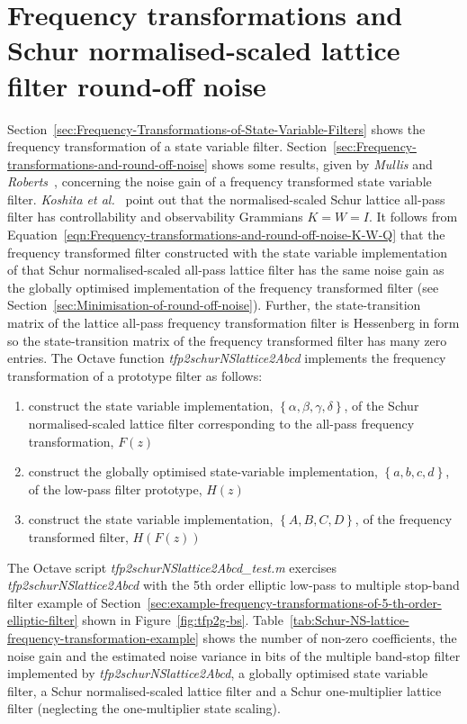 \documentclass[a4paper,twoside,10pt,english]{report}
\begin{document}
\section{\label{sec:Frequency-transformations-and-normalised-scaled-lattice-filter-round-off-noise}Frequency transformations and Schur normalised-scaled lattice filter round-off noise}
Section~\ref{sec:Frequency-Transformations-of-State-Variable-Filters} shows
the frequency transformation of a state variable filter. 
Section~\ref{sec:Frequency-transformations-and-round-off-noise} shows some
results, given by \emph{Mullis} and \emph{Roberts}~\cite[Section III]
{MullisRoberts_RoundoffNoiseInDigitalFiltersFrequencyTransformations},
concerning the noise gain of a frequency transformed state variable filter. 
\emph{Koshita et al.}~\cite{Koshita_et_al_GramianPreservingFrequencyTransformationNormalisedLattice} 
point out that the normalised-scaled Schur lattice all-pass filter has 
controllability and observability Grammians $K=W=I$. It follows from 
Equation~\ref{eqn:Frequency-transformations-and-round-off-noise-K-W-Q} that 
the frequency transformed filter constructed with the state variable 
implementation of that Schur normalised-scaled all-pass lattice 
filter has the same noise gain as the globally optimised implementation of the
frequency transformed filter (see 
Section~\ref{sec:Minimisation-of-round-off-noise}). Further, the 
state-transition matrix of the lattice all-pass frequency transformation filter
is Hessenberg in form so the state-transition matrix of the frequency 
transformed filter has many zero entries. The Octave function
\emph{tfp2schurNSlattice2Abcd} implements the frequency transformation of a 
prototype filter as follows:
\begin{enumerate} 
\item construct the state variable implementation, 
$\left\{\alpha,\beta,\gamma,\delta\right\}$, of the Schur normalised-scaled
lattice filter corresponding to the all-pass frequency transformation, 
$F\left(z\right)$
\item construct the globally optimised state-variable implementation,
$\left\{a,b,c,d\right\}$, of the low-pass filter prototype, $H\left(z\right)$
\item construct the state variable implementation, $\left\{A,B,C,D\right\}$,
of the frequency transformed filter, $H\left(F\left(z\right)\right)$
\end{enumerate} 
The Octave script \emph{tfp2schurNSlattice2Abcd\_test.m} exercises 
\emph{tfp2schurNSlattice2Abcd} with the 5th order elliptic low-pass to 
multiple stop-band filter example of 
Section~\ref{sec:example-frequency-transformations-of-5-th-order-elliptic-filter}
shown in Figure~\ref{fig:tfp2g-bs}. 
Table~\ref{tab:Schur-NS-lattice-frequency-transformation-example} shows the 
number of non-zero coefficients, the noise gain and the estimated noise variance
in bits of the multiple band-stop filter implemented by 
\emph{tfp2schurNSlattice2Abcd}, a globally optimised state variable filter, 
a Schur normalised-scaled lattice filter and a Schur one-multiplier lattice 
filter (neglecting the one-multiplier state scaling).

\clearpage
\end{document}
